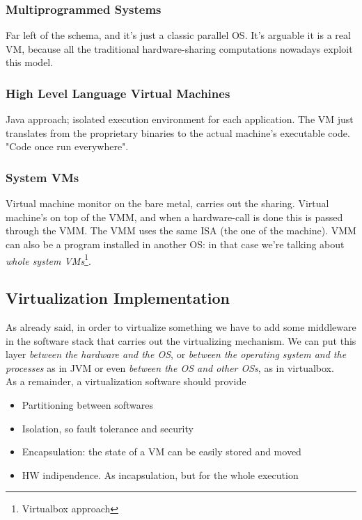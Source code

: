 \documentclass[10pt,a4paper]{article}
\begin{document}
				\subsubsection{Multiprogrammed Systems}
					Far left of the schema, and it's just a classic parallel OS. It's arguable it is a real VM, because all the traditional hardware-sharing computations nowadays exploit this model. 
					
				\subsubsection{High Level Language Virtual Machines}
					Java approach; isolated execution environment for each application. The VM just translates from the proprietary binaries to the actual machine's executable code. "Code once run everywhere".
					
				\subsubsection{System VMs}
					Virtual machine monitor on the bare metal, carries out the sharing. Virtual machine's on top of the VMM, and when a hardware-call is done this is passed through the VMM. The VMM uses the same ISA (the one of the machine). VMM can also be a program installed in another OS: in that case we're talking about \emph{whole system VMs}\footnote{Virtualbox approach}.
				
			\subsection{Virtualization Implementation}
				As already said, in order to virtualize something we have to add some middleware in the software stack that carries out the virtualizing mechanism. We can put this layer \emph{between the hardware and the OS}, or \emph{between the operating system and the processes} as in JVM or even \emph{between the OS and other OSs}, as in virtualbox.\\
				As a remainder, a virtualization software should provide
				\begin{itemize}
					\item Partitioning between softwares
					\item Isolation, so fault tolerance and security
					\item Encapsulation: the state of a VM can be easily stored and moved
					\item HW indipendence. As incapsulation, but for the whole execution
				\end{itemize}
			
\end{document}
